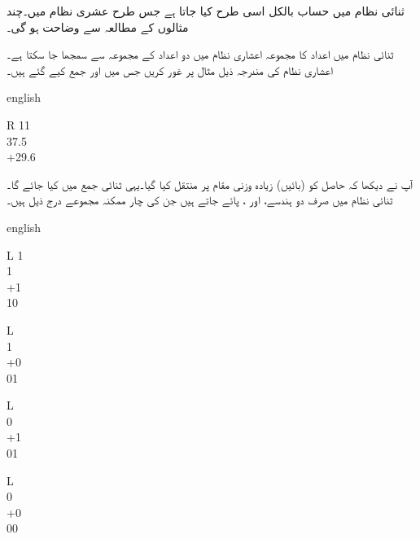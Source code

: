 	ثنائی نظام میں حساب بالکل اسی طرح کیا جاتا ہے جس طرح عشری  نظام میں۔چند مثالوں کے مطالعہ سے وضاحت ہو گی۔
	
	ثنائی نظام میں اعداد کا مجموعہ اعشاری نظام میں دو اعداد کے مجموعہ سے سمجھا جا سکتا ہے۔اعشاری نظام کی مندرجہ ذیل مثال پر غور کریں جس میں  اور  جمع کیے گئے ہیں۔
\begin{center}
\begin{otherlanguage*}{english}
\begin{LTR}
\begin{tabular}{R}
11\phantom{.5}\\
37.5\\
+29.6\\
\end{tabular}
\end{LTR}
\end{otherlanguage*}
\end{center}
آپ نے دیکھا کہ حاصل کو (بائیں) زیادہ وزنی مقام پر منتقل کیا گیا۔یہی ثنائی جمع میں کیا جائے گا۔ ثنائی نظام میں صرف دو ہندسے،  اور ، پائے جاتے ہیں جن کی چار ممکنہ مجموعے درج ذیل ہیں۔
\begin{center}
\begin{otherlanguage*}{english}
\begin{LTR}
\begin{tabular}{L}
\phantom{1}1\\
\phantom{+}1\\
+1\\
\midrule
\phantom{1}10
\end{tabular}\quad\quad
\begin{tabular}{L}
\phantom{11}\\
\phantom{+}1\\
+0\\
\midrule
\phantom{1}01
\end{tabular}\quad\quad
\begin{tabular}{L}
\phantom{11}\\
\phantom{+}0\\
+1\\
\midrule
\phantom{1}01
\end{tabular}\quad\quad
\begin{tabular}{L}
\phantom{11}\\
\phantom{+}0\\
+0\\
\midrule
\phantom{1}00
\end{tabular}
\end{LTR}
\end{otherlanguage*}
\end{center}

